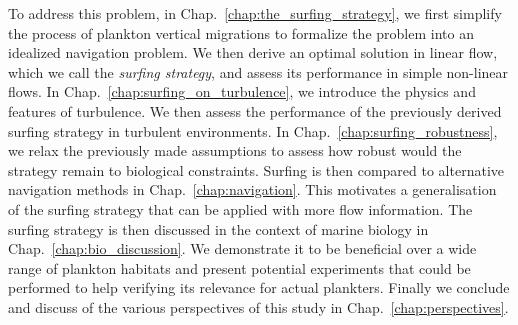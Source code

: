 To address this problem, in Chap.~\ref{chap:the_surfing_strategy}, we first simplify the process of plankton vertical migrations to formalize the problem into an idealized navigation problem.
We then derive an optimal solution in linear flow, which we call the \textit{surfing strategy}, and assess its performance in simple non-linear flows.
In Chap.~\ref{chap:surfing_on_turbulence}, we introduce the physics and features of turbulence. 
We then assess the performance of the previously derived surfing strategy in turbulent environments.
In Chap.~\ref{chap:surfing_robustness}, we relax the previously made assumptions to assess how robust would the strategy remain to biological constraints.
Surfing is then compared to alternative navigation methods in Chap.~\ref{chap:navigation}.
This motivates a generalisation of the surfing strategy that can be applied with more flow information.
The surfing strategy is then discussed in the context of marine biology in Chap.~\ref{chap:bio_discussion}.
We demonstrate it to be beneficial over a wide range of plankton habitats and present potential experiments that could be performed to help verifying its relevance for actual plankters.
Finally we conclude and discuss of the various perspectives of this study in Chap.~\ref{chap:perspectives}.

% 
% 

